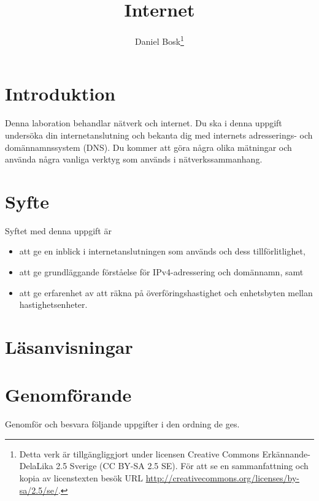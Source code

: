 \documentclass[a4paper,nocourse]{miunasgn}
\title{Internet}
\author{Daniel Bosk\footnote{%
	Detta verk är tillgängliggjort under licensen Creative Commons 
	Erkännande-DelaLika 2.5 Sverige (CC BY-SA 2.5 SE).
	För att se en sammanfattning och kopia av licenstexten besök URL 
	\url{http://creativecommons.org/licenses/by-sa/2.5/se/}.
}}
\date{\svnId}
\begin{document}
\maketitle
\thispagestyle{foot}
\tableofcontents


\section{Introduktion}
\label{sec:Introduktion}
\noindent
Denna laboration behandlar nätverk och internet.
Du ska i denna uppgift undersöka din internetanslutning och bekanta dig med
internets adresserings- och domännamnssystem (DNS).
Du kommer att göra några olika mätningar och använda några vanliga verktyg som 
används i nätverkssammanhang.


\section{Syfte}
\label{sec:Syfte}
\noindent
Syftet med denna uppgift är
\begin{itemize}
		\item att ge en inblick i internetanslutningen som används och dess
		tillförlitlighet,
    \item att ge grundläggande förståelse för IPv4-adressering och domännamn,
		samt
	\item att ge erfarenhet av att räkna på överföringshastighet och
		enhetsbyten mellan hastighetsenheter.
\end{itemize}


\section{Läsanvisningar}
\label{sec:Lasanvisningar}
\noindent



\section{Genomförande}
\label{sec:Genomforande}
\noindent
Genomför och besvara följande uppgifter i den ordning de ges.
\end{document}
